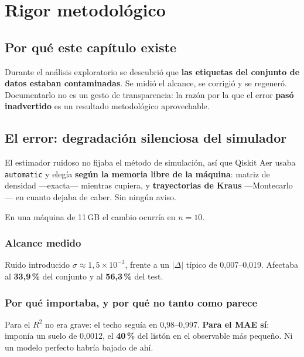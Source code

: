 \chapter{Rigor metodológico}
\label{cap:rigor}


\section{Por qué este capítulo existe}
\label{sec:porque_rigor}
Durante el análisis exploratorio se descubrió que \textbf{las etiquetas del conjunto de datos
estaban contaminadas}. Se midió el alcance, se corrigió y se regeneró. Documentarlo no es un
gesto de transparencia: la razón por la que el error \textbf{pasó inadvertido} es un resultado
metodológico aprovechable.

\section{El error: degradación silenciosa del simulador}
\label{sec:bug}
El estimador ruidoso no fijaba el método de simulación, así que Qiskit Aer usaba
\texttt{automatic} y elegía \textbf{según la memoria libre de la máquina}: matriz de densidad
—exacta— mientras cupiera, y \textbf{trayectorias de Kraus} —Montecarlo— en cuanto dejaba de
caber. Sin ningún aviso.

En una máquina de 11\,GB el cambio ocurría en $n = 10$.

\subsection{Alcance medido}
Ruido introducido $\sigma \approx 1{,}5\times10^{-3}$, frente a un $|\Delta|$ típico de
0,007--0,019. Afectaba al \textbf{33,9\,\%} del conjunto y al \textbf{56,3\,\%} del test.

\subsection{Por qué importaba, y por qué no tanto como parece}
Para el $R^2$ no era grave: el techo seguía en 0,98--0,997. \textbf{Para el MAE sí}: imponía
un suelo de 0,0012, el \textbf{40\,\%} del listón en el observable más pequeño. Ni un modelo
perfecto habría bajado de ahí.


